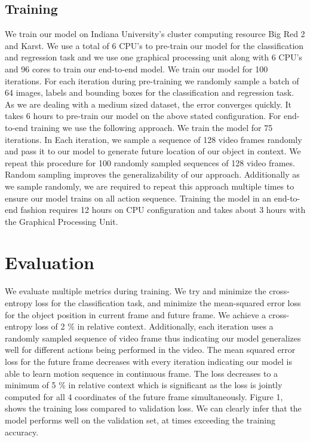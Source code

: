 \documentclass[sigconf]{acmart}
\begin{document}
\subsection{Training}

We train our model on Indiana University's cluster computing resource Big Red 2 and Karst. We use a total of 6 CPU's to pre-train our model for the classification and regression task and we use one graphical processing unit along with 6 CPU's and 96 cores to train our end-to-end model.  We train our model for 100 iterations. For each iteration during pre-training we randomly sample a batch of 64 images, labels and bounding boxes for the classification and regression task. As we are dealing with a medium sized dataset, the error converges quickly. It takes 6 hours to pre-train our model on the above stated configuration. For end-to-end training we use the following approach. We train the model for 75 iterations. In Each iteration, we sample a sequence of 128 video frames randomly and pass it to our model to generate future location of our object in context. We repeat this procedure for 100 randomly sampled sequences of 128 video frames. Random sampling improves the generalizability of our approach. Additionally as we sample randomly, we are required to repeat this approach multiple times to ensure our model trains on all action sequence. Training the model in an end-to-end fashion requires 12 hours on CPU configuration and takes about 3 hours with the Graphical Processing Unit. 


\section{Evaluation} \label{results}

We evaluate multiple metrics during training. We try and minimize the cross-entropy loss for the classification task, and minimize the mean-squared error loss for the object position in current frame and future frame. We achieve a cross-entropy loss of 2 \% in relative context. Additionally, each iteration uses a randomly sampled sequence of video frame thus indicating our model generalizes well for different actions being performed in the video. The mean squared error loss for the future frame decreases with every iteration indicating our model is able to learn motion sequence in continuous frame. The loss decreases to a minimum of 5 \% in relative context which is significant as the loss is jointly computed for all 4 coordinates of the future frame simultaneously. Figure 1, shows the training loss compared to validation loss. We can clearly infer that the model performs well on the validation set, at times exceeding the training accuracy.
\end{document}
